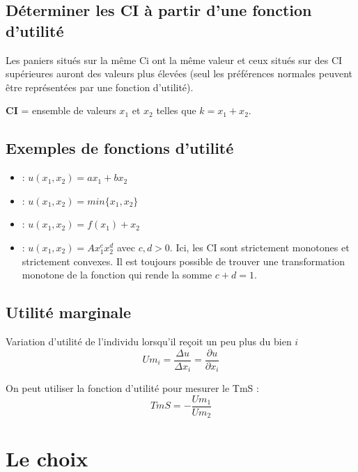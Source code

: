 \subsection{Déterminer les CI à partir d'une fonction d'utilité}

Les paniers situés sur la même Ci ont la même valeur et ceux situés sur des CI supérieures auront des valeurs plus élevées (seul les préférences normales peuvent être représentées par une fonction d'utilité).

\textbf{CI} = ensemble de valeurs $x_1$ et $x_2$ telles que $k = x_1 + x_2$.

\subsection{Exemples de fonctions d'utilité}

\begin{itemize}
\item {} : $u(x_1,x_2) = ax_1 + bx_2$
\item {} : $u(x_1,x_2) = min\{x_1,x_2\}$
\item {} : $u(x_1,x_2) = f(x_1) + x_2$
\item {} : $u(x_1,x_2) = Ax^c_1x^d_2$ avec $c,d > 0$.
Ici, les CI sont strictement monotones et strictement convexes. Il est toujours possible de trouver une transformation monotone de la fonction qui rende la somme $c+d=1$.
\end{itemize}

\subsection{Utilité marginale}

Variation d'utilité de l'individu lorsqu'il reçoit un peu plus du bien $i$
\begin{equation*}
Um_i = \frac{\Delta u}{\Delta x_i} = \frac{\partial u}{\partial x_i}
\end{equation*}

On peut utiliser la fonction d'utilité pour mesurer le TmS :
\begin{equation*}
TmS = -\frac{Um_1}{Um_2}
\end{equation*}

\section{Le choix}

